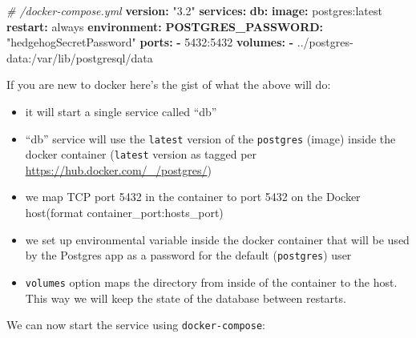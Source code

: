 \documentclass[
  oneside]{book}
\newenvironment{Shaded}{\begin{snugshade}}{\end{snugshade}}
\newcommand{\AttributeTok}[1]{\textcolor[rgb]{0.13,0.29,0.53}{#1}}
\newcommand{\CommentTok}[1]{\textcolor[rgb]{0.56,0.35,0.01}{\textit{#1}}}
\newcommand{\ExtensionTok}[1]{#1}
\newcommand{\FunctionTok}[1]{\textcolor[rgb]{0.13,0.29,0.53}{\textbf{#1}}}
\newcommand{\KeywordTok}[1]{\textcolor[rgb]{0.13,0.29,0.53}{\textbf{#1}}}
\newcommand{\NormalTok}[1]{#1}
\newcommand{\StringTok}[1]{\textcolor[rgb]{0.31,0.60,0.02}{#1}}
\providecommand{\tightlist}{%
  \setlength{\itemsep}{0pt}\setlength{\parskip}{0pt}}
\begin{document}
\begin{Shaded}
\begin{Highlighting}[]
\CommentTok{\# /docker{-}compose.yml}
\FunctionTok{version}\KeywordTok{:}\AttributeTok{ }\StringTok{"3.2"}
\FunctionTok{services}\KeywordTok{:}
\AttributeTok{  }\FunctionTok{db}\KeywordTok{:}
\AttributeTok{    }\FunctionTok{image}\KeywordTok{:}\AttributeTok{ postgres:latest}
\AttributeTok{    }\FunctionTok{restart}\KeywordTok{:}\AttributeTok{ always}
\AttributeTok{    }\FunctionTok{environment}\KeywordTok{:}
\AttributeTok{      }\FunctionTok{POSTGRES\_PASSWORD}\KeywordTok{:}\AttributeTok{ }\StringTok{"hedgehogSecretPassword"}
\AttributeTok{    }\FunctionTok{ports}\KeywordTok{:}
\AttributeTok{      }\KeywordTok{{-}}\AttributeTok{ 5432:5432}
\AttributeTok{    }\FunctionTok{volumes}\KeywordTok{:}
\AttributeTok{      }\KeywordTok{{-}}\AttributeTok{ ../postgres{-}data:/var/lib/postgresql/data}
\end{Highlighting}
\end{Shaded}

If you are new to docker here's the gist of what the above will do:

\begin{itemize}
\tightlist
\item
  it will start a single service called ``db''
\item
  ``db'' service will use the \texttt{latest} version of the \texttt{postgres} (image) inside the docker container (\texttt{latest} version as tagged per \url{https://hub.docker.com/_/postgres/})
\item
  we map TCP port 5432 in the container to port 5432 on the Docker host(format container\_port:hosts\_port)
\item
  we set up environmental variable inside the docker container that will be used by the Postgres app as a password for the default (\texttt{postgres}) user
\item
  \texttt{volumes} option maps the directory from inside of the container to the host. This way we will keep the state of the database between restarts.
\end{itemize}

\newpage

We can now start the service using \texttt{docker-compose}:

\begin{Shaded}
\end{Shaded}
\end{document}
